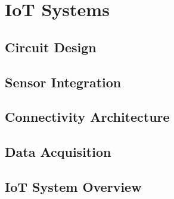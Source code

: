 \chapter{IoT Systems}

\section{Circuit Design}

\section{Sensor Integration}

\section{Connectivity Architecture}

\section{Data Acquisition}

\section{IoT System Overview}
